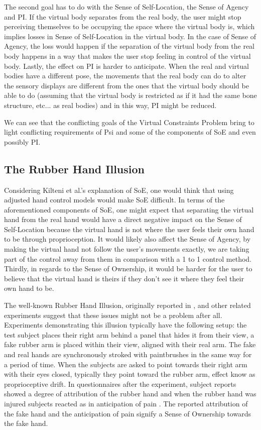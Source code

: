 The second goal has to do with the Sense of Self-Location,  the Sense of Agency and PI. If the virtual body separates from the real body, the user might stop perceiving themselves to be occupying the space where the virtual body is, which implies losses in Sense of Self-Location in the virtual body. In the case of Sense of Agency, the loss would happen if the separation of the virtual body from the real body happens in a way that makes the user stop feeling in control of the virtual body. Lastly, the effect on PI is harder to anticipate. When the real and virtual bodies have a different pose, the movements that the real body can do to alter the sensory displays are different from the ones that the virtual body should be able to do (assuming that the virtual body is restricted as if it had the same bone structure, etc... as real bodies) and in this way, PI might be reduced.

We can see that the conflicting goals of the Virtual Constraints Problem bring to light conflicting requirements of Psi and some of the components of SoE and even possibly PI.

\subsection{The Rubber Hand Illusion}
\label{subsec:rubberHandIllusion}

Considering Kilteni et al.'s explanation of SoE, one would think that using adjusted hand control models would make SoE difficult. In terms of the aforementioned components of SoE, one might expect that separating the virtual hand from the real hand would have a direct negative impact on the Sense of Self-Location because the virtual hand is not where the user feels their own hand to be through proprioception. It would likely also affect the Sense of Agency, by making the virtual hand not follow the user's movements exactly, we are taking part of the control away from them in comparison with a 1 to 1 control method. Thirdly, in regards to the Sense of Ownership, it would be harder for the user to believe that the virtual hand is theirs if they don't see it where they feel their own hand to be.

The well-known Rubber Hand Illusion, originally reported in \parencite{Botvinick1998}, and other related experiments suggest that these issues might not be a problem after all. Experiments demonstrating this illusion typically have the following setup: the test subject places their right arm behind a panel that hides it from their view, a fake rubber arm is placed within their view, aligned with their real arm. The fake and real hands are synchronously stroked with paintbrushes in the same way for a period of time. When the subjects are asked to point towards their right arm with their eyes closed, typically they point toward the rubber arm, effect know as proprioceptive drift. In questionnaires after the experiment, subject reports showed a degree of attribution of the rubber hand \parencite{Botvinick1998} and when the rubber hand was injured subjects reacted as in anticipation of pain \parencite{Armel2003}. The reported attribution of the fake hand and the anticipation of pain signify a Sense of Ownership towards the fake hand.

